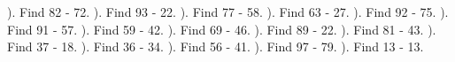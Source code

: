 \documentclass{article}%
\begin{document}
\newline%
). Find 82 {-} 72.%
\newline%
\newline%
). Find 93 {-} 22.%
\newline%
\newline%
). Find 77 {-} 58.%
\newline%
\newline%
). Find 63 {-} 27.%
\newline%
\newline%
). Find 92 {-} 75.%
\newline%
\newline%
). Find 91 {-} 57.%
\newline%
\newline%
). Find 59 {-} 42.%
\newline%
\newline%
). Find 69 {-} 46.%
\newline%
\newline%
). Find 89 {-} 22.%
\newline%
\newline%
). Find 81 {-} 43.%
\newline%
\newline%
). Find 37 {-} 18.%
\newline%
\newline%
). Find 36 {-} 34.%
\newline%
\newline%
). Find 56 {-} 41.%
\newline%
\newline%
). Find 97 {-} 79.%
\newline%
\newline%
). Find 13 {-} 13.%
\newline%
\newline%
\end{document}
